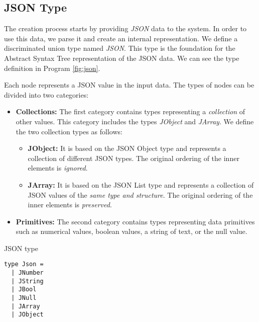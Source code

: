 \subsection{JSON Type}
\label{sub:json}
The creation process starts by providing \emph{JSON} data to the system.
In order to use this data, we parse it and create an internal representation.
We define a discriminated union type named \emph{JSON}.
This type is the foundation for the Abstract Syntax Tree representation of the JSON data.
We can see the type definition in Program \ref{fig:json}.


Each node represents a JSON value in the input data.
The types of nodes can be divided into two categories:
\begin{itemize}
	\item {\textbf{Collections:} The first category contains types representing a \emph{collection} of other values. This category includes the types \emph{JObject} and \emph{JArray}.
	      We define the two collection types as follows:
	      \begin{itemize}
		      \item \textbf{JObject:} It is based on the JSON Object type and represents a collection of different JSON types. The original ordering of the inner elements is \emph{ignored}.
		      \item \textbf{JArray:} It is based on the JSON List type and represents a collection of JSON values of the \emph{same type and structure}. The original ordering of the inner elements is \emph{preserved}.
	      \end{itemize}
	      }
	\item \textbf{Primitives:} The second category contains types representing data primitives such as numerical values, boolean values,
	      a string of text, or the null value.
\end{itemize}

\begin{listing}[htbp]
	\caption {JSON type}
	\label{fig:json}
	\begin{lstlisting}
type Json =
  | JNumber 
  | JString 
  | JBool
  | JNull
  | JArray 
  | JObject 
  \end{lstlisting}
\end{listing}

